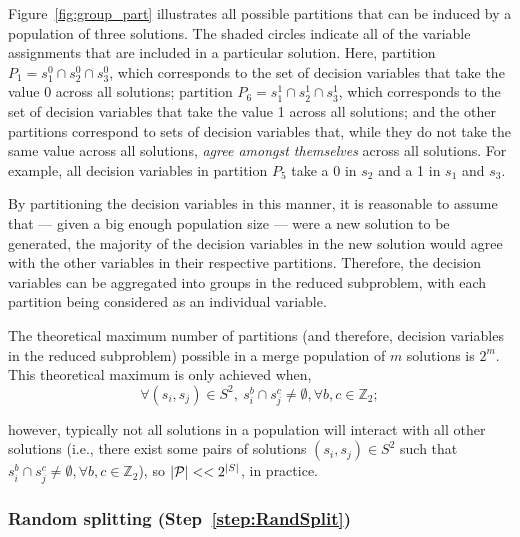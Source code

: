 \documentclass[authoryear,11pt,square,number,times,super,comma]{elsarticle}
\newcommand{\Bin}{\ensuremath{\mathbb{Z}_2}}
\begin{document}
Figure~\ref{fig:group_part} illustrates all possible partitions that can be induced by a population of three solutions. The shaded circles indicate all of the variable assignments that are included in a particular solution. Here, partition $P_1=s^0_1 \cap s^0_2 \cap s^0_3$, which corresponds to the set of decision variables that take the value 0 across all solutions; partition $P_6=s^1_1 \cap s^1_2 \cap s^1_3$, which corresponds to the set of decision variables that take the value 1 across all solutions; and the other partitions correspond to sets of decision variables that, while they do not take the same value across all solutions, \emph{agree amongst themselves} across all solutions. For example, all decision variables in partition $P_5$ take a 0 in $s_2$ and a 1 in $s_1$ and $s_3$.
 
By partitioning the decision variables in this manner, it is reasonable to assume that --- given a big enough population size --- were a new solution to be generated, the majority of the decision variables in the new solution would agree with the other variables in their respective partitions. Therefore, the decision variables can be aggregated into groups in the reduced subproblem, with each partition being considered as an individual variable. 

The theoretical maximum number of partitions (and therefore, decision variables in the reduced subproblem) possible in a merge population of $m$ solutions is $2^m$. This theoretical maximum is only achieved when,
\begin{equation*}
\forall (s_i,s_j) \in S^2,\ s^b_i \cap s^c_j \neq \emptyset, \forall b,c \in \Bin; \label{sec:merge:part:bound}
\end{equation*}

however, typically not all solutions in a population will interact with all other solutions (i.e., there exist some pairs of solutions $(s_i,s_j) \in S^2$ such that $s^b_i \cap s^c_j \neq \emptyset, \forall b,c \in \Bin$), so $|{\cal P}| << 2^{|S|}$, in practice.

\subsubsection*{Random splitting (Step~\ref{step:RandSplit})}
\end{document}
